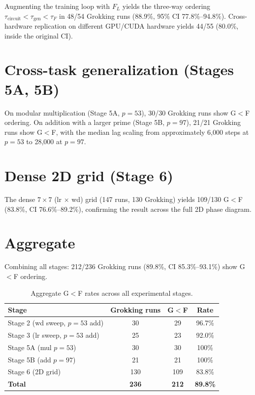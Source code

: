 \documentclass[12pt,openany,a4paper]{book}
\newcommand{\taug}{\tau_{\mathrm{gen}}}
\newcommand{\tauf}{\tau_{F}}
\newcommand{\taucirc}{\tau_{\mathrm{circuit}}}
\newcommand{\flogit}{F_{L}}
\begin{document}
Augmenting the training loop with $\flogit$ yields the three-way ordering $\taucirc < \taug < \tauf$ in 48/54 Grokking runs (88.9\%, 95\% CI 77.8\%--94.8\%). Cross-hardware replication on different GPU/CUDA hardware yields 44/55 (80.0\%, inside the original CI).

\section{Cross-task generalization (Stages 5A, 5B)}

On modular multiplication (Stage 5A, $p=53$), 30/30 Grokking runs show G$<$F ordering. On addition with a larger prime (Stage 5B, $p=97$), 21/21 Grokking runs show G$<$F, with the median lag scaling from approximately 6,000 steps at $p=53$ to 28,000 at $p=97$.

\section{Dense 2D grid (Stage 6)}

The dense $7 \times 7$ (lr $\times$ wd) grid (147 runs, 130 Grokking) yields 109/130 G$<$F (83.8\%, CI 76.6\%--89.2\%), confirming the result across the full 2D phase diagram.

\section{Aggregate}

Combining all stages: 212/236 Grokking runs (89.8\%, CI 85.3\%--93.1\%) show G$<$F ordering.

\begin{table}[htbp]
  \centering
  \caption{Aggregate G$<$F rates across all experimental stages.}
  \label{tab:aggregate}
  \small
  \begin{tabular}{lccc}
    \toprule
    Stage & Grokking runs & G$<$F & Rate \\
    \midrule
    Stage 2 (wd sweep, $p{=}53$ add) & 30 & 29 & 96.7\% \\
    Stage 3 (lr sweep, $p{=}53$ add) & 25 & 23 & 92.0\% \\
    Stage 5A (mul $p{=}53$) & 30 & 30 & 100\% \\
    Stage 5B (add $p{=}97$) & 21 & 21 & 100\% \\
    Stage 6 (2D grid) & 130 & 109 & 83.8\% \\
    \midrule
    \textbf{Total} & \textbf{236} & \textbf{212} & \textbf{89.8\%} \\
    \bottomrule
  \end{tabular}
\end{table}
\end{document}
